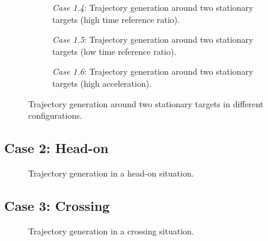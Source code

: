 \begin{figure}
    \centering
    \begin{subfigure}[b]{\textwidth}
        \centering
        
        \caption{\emph{Case 1.4}: Trajectory generation around two stationary targets (high time reference ratio).}
        \label{fig:stationary-target-5}
    \end{subfigure}
    \hfill
    \begin{subfigure}[b]{\textwidth}
        \centering
        
        \caption{\emph{Case 1.5}: Trajectory generation around two stationary targets (low time reference ratio).}
        \label{fig:stationary-target-6}
    \end{subfigure}
    \hfill
    \begin{subfigure}[b]{\textwidth}
        \centering
        
        \caption{\emph{Case 1.6}: Trajectory generation around two stationary targets (high acceleration).}
        \label{fig:stationary-target-7}
    \end{subfigure}
    \caption{Trajectory generation around two stationary targets in different configurations.}
    \label{fig:stationary-targets-subfigures-2}
\end{figure}


\subsection{Case 2: Head-on}
\label{sec:case-2-head-on}
\begin{figure}
    \centering
    
    \caption{Trajectory generation in a head-on situation.}
    \label{fig:head-on}
\end{figure}

\subsection{Case 3: Crossing}
\label{sec:case-3-crossing}
\begin{figure}
    \centering
    
    \caption{Trajectory generation in a crossing situation.}
    \label{fig:crossing}
\end{figure}


